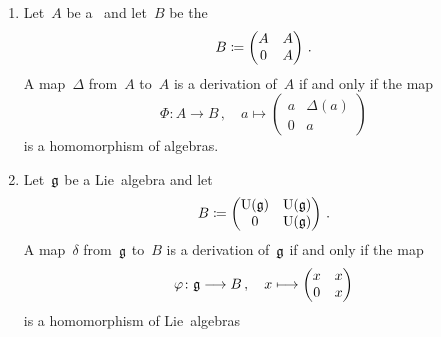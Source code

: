 \begin{lemma}
  \label{translating between derivations and homomorphisms}
  \leavevmode
  \begin{enumerate}
    \item
      Let~$A$ be a~\algebra{$\kf$} and let~$B$ be the~\algebra{$\kf$}
      \[
        B
        \coloneqq
        \begin{pmatrix}
          A & A \\
          0 & A
        \end{pmatrix} \,.
      \]
      A map~$\Delta$ from~$A$ to~$A$ is a derivation of~$A$ if and only if the map
      \[
        \Phi
        \colon
        A
        \to
        B \,,
        \quad
        a
        \mapsto
        \begin{pmatrix}
          a & \Delta(a) \\
          0 & a
        \end{pmatrix}
      \]
      is a homomorphism of algebras.
    \item
      Let~$\mathfrak{g}$ be a Lie~algebra and let
      \[
        B
        \coloneqq
        \begin{pmatrix}
          \operatorname{U}(\mathfrak{g})  & \operatorname{U}(\mathfrak{g})  \\
          0             & \operatorname{U}(\mathfrak{g})
        \end{pmatrix} \,.
      \]
      A map~$\delta$ from~$\mathfrak{g}$ to~$B$ is a derivation of~$\mathfrak{g}$ if and only if the map
      \[
        \varphi
        \colon
        \glie
        \to
        B \,,
        \quad
        x
        \mapsto
        \begin{pmatrix}
          x & x \\
          0 & x
        \end{pmatrix}
      \]
      is a homomorphism of Lie~algebras
  \end{enumerate}
\end{lemma}


